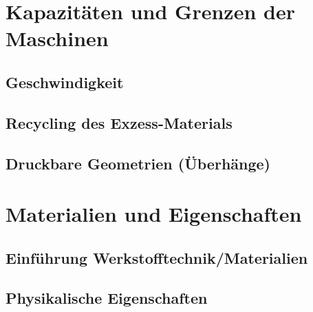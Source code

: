 \documentclass[12pt]{article}
\begin{document}

%
\pagebreak
\pagebreak
{}
\tableofcontents
\pagebreak



\section{Kapazitäten und Grenzen der Maschinen}
\subsection{Geschwindigkeit}
\subsection{Recycling des Exzess-Materials}
\subsection{Druckbare Geometrien (Überhänge)}
\section{Materialien und Eigenschaften}
\subsection{Einführung Werkstofftechnik/Materialien}
\subsection{Physikalische Eigenschaften}


\pagebreak
\pagebreak

\printnoidxglossary[sort=use, type=\acronymtype]
\printnoidxglossary[sort=use]

\pagebreak
\printbibliography[filter=def]

\pagebreak
\newrefcontext[sorting=none,labelprefix={Web\space}]
\printbibliography[title={Web-Quellen}, filter=web]

\pagebreak
\listoffigures
\end{document}
